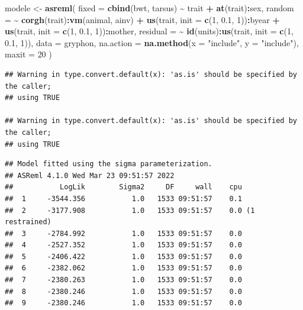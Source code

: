 \documentclass[
  12pt,
]{book}
\newenvironment{Shaded}{\begin{snugshade}}{\end{snugshade}}
\newcommand{\DataTypeTok}[1]{\textcolor[rgb]{0.13,0.29,0.53}{#1}}
\newcommand{\DecValTok}[1]{\textcolor[rgb]{0.00,0.00,0.81}{#1}}
\newcommand{\FloatTok}[1]{\textcolor[rgb]{0.00,0.00,0.81}{#1}}
\newcommand{\KeywordTok}[1]{\textcolor[rgb]{0.13,0.29,0.53}{\textbf{#1}}}
\newcommand{\NormalTok}[1]{#1}
\newcommand{\OperatorTok}[1]{\textcolor[rgb]{0.81,0.36,0.00}{\textbf{#1}}}
\newcommand{\StringTok}[1]{\textcolor[rgb]{0.31,0.60,0.02}{#1}}
\begin{document}
\begin{Shaded}
\begin{Highlighting}[]
\NormalTok{modele \textless{}{-}}\StringTok{ }\KeywordTok{asreml}\NormalTok{(}
  \DataTypeTok{fixed =} \KeywordTok{cbind}\NormalTok{(bwt, tarsus) }\OperatorTok{\textasciitilde{}}\StringTok{ }\NormalTok{trait }\OperatorTok{+}\StringTok{ }\KeywordTok{at}\NormalTok{(trait)}\OperatorTok{:}\NormalTok{sex,}
  \DataTypeTok{random =} \OperatorTok{\textasciitilde{}}\StringTok{ }\KeywordTok{corgh}\NormalTok{(trait)}\OperatorTok{:}\KeywordTok{vm}\NormalTok{(animal, ainv) }\OperatorTok{+}
\StringTok{    }\KeywordTok{us}\NormalTok{(trait, }\DataTypeTok{init =} \KeywordTok{c}\NormalTok{(}\DecValTok{1}\NormalTok{, }\FloatTok{0.1}\NormalTok{, }\DecValTok{1}\NormalTok{))}\OperatorTok{:}\NormalTok{byear }\OperatorTok{+}
\StringTok{    }\KeywordTok{us}\NormalTok{(trait, }\DataTypeTok{init =} \KeywordTok{c}\NormalTok{(}\DecValTok{1}\NormalTok{, }\FloatTok{0.1}\NormalTok{, }\DecValTok{1}\NormalTok{))}\OperatorTok{:}\NormalTok{mother,}
  \DataTypeTok{residual =} \OperatorTok{\textasciitilde{}}\StringTok{ }\KeywordTok{id}\NormalTok{(units)}\OperatorTok{:}\KeywordTok{us}\NormalTok{(trait, }\DataTypeTok{init =} \KeywordTok{c}\NormalTok{(}\DecValTok{1}\NormalTok{, }\FloatTok{0.1}\NormalTok{, }\DecValTok{1}\NormalTok{)),}
  \DataTypeTok{data =}\NormalTok{ gryphon,}
  \DataTypeTok{na.action =} \KeywordTok{na.method}\NormalTok{(}\DataTypeTok{x =} \StringTok{"include"}\NormalTok{, }\DataTypeTok{y =} \StringTok{"include"}\NormalTok{),}
  \DataTypeTok{maxit =} \DecValTok{20}
\NormalTok{)}
\end{Highlighting}
\end{Shaded}

\begin{verbatim}
## Warning in type.convert.default(x): 'as.is' should be specified by the caller;
## using TRUE

## Warning in type.convert.default(x): 'as.is' should be specified by the caller;
## using TRUE
\end{verbatim}

\begin{verbatim}
## Model fitted using the sigma parameterization.
## ASReml 4.1.0 Wed Mar 23 09:51:57 2022
##           LogLik        Sigma2     DF     wall    cpu
##  1     -3544.356           1.0   1533 09:51:57    0.1
##  2     -3177.908           1.0   1533 09:51:57    0.0 (1 restrained)
##  3     -2784.992           1.0   1533 09:51:57    0.0
##  4     -2527.352           1.0   1533 09:51:57    0.0
##  5     -2406.422           1.0   1533 09:51:57    0.0
##  6     -2382.062           1.0   1533 09:51:57    0.0
##  7     -2380.263           1.0   1533 09:51:57    0.0
##  8     -2380.246           1.0   1533 09:51:57    0.0
##  9     -2380.246           1.0   1533 09:51:57    0.0
\end{verbatim}
\end{document}
